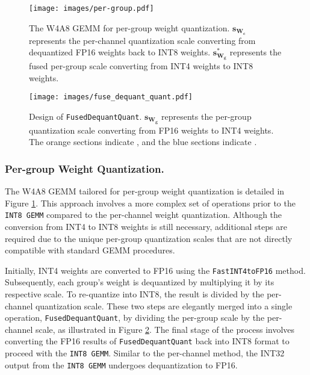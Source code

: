 \begin{figure}[ht]
\centering
\texttt{[image: images/per-group.pdf]}
\caption{The W4A8 GEMM for per-group weight quantization. $\mathbf{s_{W_c}}$ represents the per-channel quantization scale converting from dequantized FP16 weights back to INT8 weights. $\mathbf{s_{W_g}^{*}}$ represents the fused per-group scale converting from INT4 weights to INT8 weights.}
\label{fig:fig4}
\vspace{-0.1in}
\end{figure}

\begin{figure}[ht]
\centering
\texttt{[image: images/fuse\_dequant\_quant.pdf]}
\caption{Design of \texttt{FusedDequantQuant}. $\mathbf{s_{W_g}}$ represents the per-group quantization scale converting from FP16 weights to INT4 weights.
The orange sections indicate , and the blue sections indicate .}
\label{fig:fig5}
\vspace{-0.1in}
\end{figure}

\subsubsection{Per-group Weight Quantization.}
The W4A8 GEMM tailored for per-group weight quantization is detailed in Figure \ref{fig:fig4}. This approach involves a more complex set of operations prior to the \texttt{INT8 GEMM} compared to the per-channel weight quantization. Although the conversion from INT4 to INT8 weights is still necessary, additional steps are required due to the unique per-group quantization scales that are not directly compatible with standard GEMM procedures.

Initially, INT4 weights are converted to FP16 using the \texttt{FastINT4toFP16} \citep{kim2022says} method. Subsequently, each group's weight is dequantized by multiplying it by its respective scale. To re-quantize into INT8, the result is divided by the per-channel quantization scale. These two steps are elegantly merged into a single operation, \texttt{FusedDequantQuant}, by dividing the per-group scale by the per-channel scale, as illustrated in Figure \ref{fig:fig5}.
The final stage of the process involves converting the FP16 results of \texttt{FusedDequantQuant} back into INT8 format to proceed with the \texttt{INT8 GEMM}. Similar to the per-channel method, the INT32 output from the \texttt{INT8 GEMM} undergoes dequantization to FP16.

